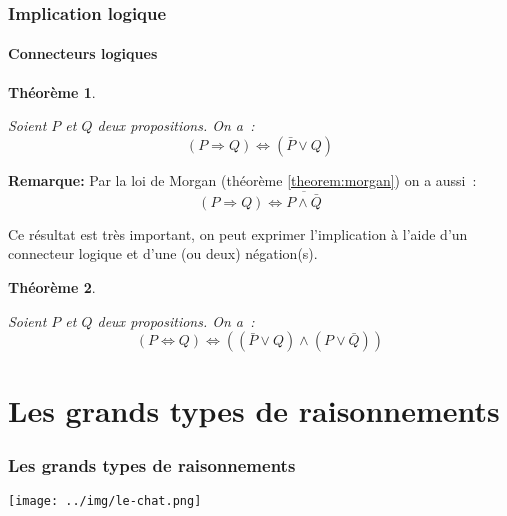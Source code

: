 \documentclass[10pt,notheorems]{beamer}
\theoremstyle{plain}
\newtheorem{theorem}{Théorème}
\theoremstyle{definition} %
\begin{document}
\begin{frame}
  \frametitle{Implication logique}
  \framesubtitle{Connecteurs logiques}
  \hypertarget{slide_implication_et_connecteurs}{}

  \begin{theorem}\label{theorem:implication:connecteurs}

    Soient $P$ et $Q$ deux propositions. On a~:
    \[
      (P \Rightarrow Q) \Leftrightarrow (\bar P \lor Q)
    \]
  \end{theorem}

  \bigskip

  \textbf{Remarque:} Par la loi de Morgan (théorème \hyperlink{slide_disjonction_conjonction_et_negation}{\ref{theorem:morgan}}) on a aussi~:
  \[
    (P \Rightarrow Q) \Leftrightarrow \overline{P \land \bar Q}
  \]

  Ce résultat est très important, on peut exprimer l'implication à l'aide d'un connecteur logique et d'une (ou deux) négation(s).\newline

  \begin{theorem}\label{theorem:equivalence:connecteurs}

    Soient $P$ et $Q$ deux propositions. On a~:
    \[
      (P \Leftrightarrow Q) \Leftrightarrow \left((\bar P \lor Q) \land (P \lor \bar Q)\right)
    \]
  \end{theorem}

\end{frame}

\section{Les grands types de raisonnements}

\begin{frame}
  \frametitle{Les grands types de raisonnements}

  \centering
  \texttt{[image: ../img/le-chat.png]}

\end{frame}


\end{document}
